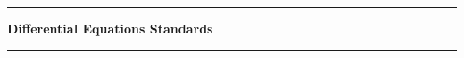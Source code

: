 \documentclass[letterpaper]{article}
\newcommand{\module}{?}
\newcommand{\setModule}[1]{\renewcommand{\module}{#1}}
\begin{document}
\pagestyle{empty}
\vspace{0.3in}
\hrule
\begin{center}\large \textbf{Differential Equations Standards}\end{center}
\hrule
\vspace{0.1in}

\setModule{C}

\setModule{S}

\setModule{F}

\setModule{N}

\setModule{D}

\end{document}
